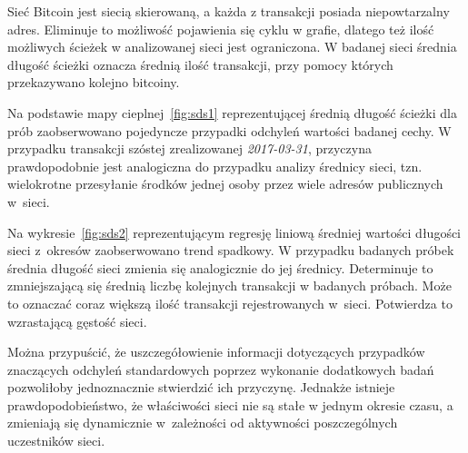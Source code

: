 \documentclass[12pt, oneside, final, openany]{mgr}
\begin{document}
\indent Sieć Bitcoin jest siecią skierowaną, a każda z transakcji posiada niepowtarzalny adres. Eliminuje to możliwość pojawienia się cyklu w grafie, dlatego też ilość możliwych ścieżek w analizowanej sieci jest ograniczona. W badanej sieci średnia długość ścieżki oznacza średnią ilość transakcji, przy pomocy których przekazywano kolejno bitcoiny.

\indent Na podstawie mapy cieplnej~\ref{fig:sds1} reprezentującej średnią długość ścieżki dla prób zaobserwowano pojedyncze przypadki odchyleń wartości badanej cechy. W przypadku transakcji szóstej zrealizowanej \textit{2017-03-31}, przyczyna prawdopodobnie jest analogiczna do przypadku analizy średnicy sieci, tzn. wielokrotne przesyłanie środków jednej osoby przez wiele adresów publicznych w~sieci.

\indent Na wykresie~\ref{fig:sds2} reprezentującym regresję liniową średniej wartości długości sieci z~okresów zaobserwowano trend spadkowy. W przypadku badanych próbek średnia długość sieci zmienia się analogicznie do jej średnicy. Determinuje to zmniejszającą się średnią liczbę kolejnych transakcji w badanych próbach. Może to oznaczać coraz większą ilość transakcji rejestrowanych w~sieci. Potwierdza to wzrastającą gęstość sieci.

\indent Można przypuścić, że uszczegółowienie informacji dotyczących przypadków znaczących odchyleń standardowych poprzez wykonanie dodatkowych badań pozwoliłoby jednoznacznie stwierdzić ich przyczynę. Jednakże istnieje prawdopodobieństwo, że właściwości sieci nie są stałe w jednym okresie czasu, a zmieniają się dynamicznie w~zależności od aktywności poszczególnych uczestników sieci.
\end{document}
